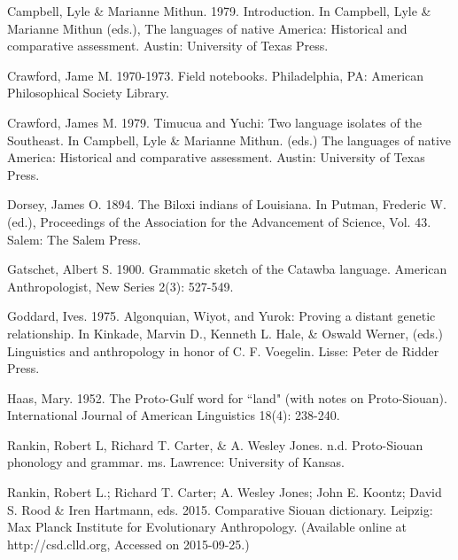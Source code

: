 \documentclass[output=paper]{LSP/langsci}
\begin{document}
{\begin{reflist}
Campbell, Lyle \& Marianne Mithun. 1979. Introduction. In Campbell, Lyle \& Marianne Mithun (eds.), The languages of native America: Historical and comparative assessment.  Austin: University of Texas Press.

 
 



Crawford, Jame M. 1970-1973. Field notebooks. Philadelphia, PA: American Philosophical Society Library.



Crawford, James M. 1979. Timucua and Yuchi: Two language isolates of the Southeast. In Campbell, Lyle \& Marianne Mithun. (eds.) The languages of native America: Historical and comparative assessment.  Austin: University of Texas Press.


 


Dorsey, James O. 1894. The Biloxi indians of Louisiana. In Putman, Frederic W. (ed.), Proceedings of the Association for the Advancement of Science, Vol. 43.  Salem: The Salem Press.

 

 


Gatschet, Albert S. 1900. Grammatic sketch of the Catawba language. American Anthropologist, New Series 2(3): 527-549.


 



Goddard, Ives. 1975. Algonquian, Wiyot, and Yurok: Proving a distant genetic relationship. In Kinkade, Marvin D., Kenneth L. Hale, \& Oswald Werner, (eds.) Linguistics and anthropology in honor of C. F. Voegelin. Lisse: Peter de Ridder Press.


 


Haas, Mary. 1952. The Proto-Gulf word for ``land" (with notes on Proto-Siouan). International Journal of American Linguistics 18(4): 238-240.


 

 

 
 


Rankin, Robert L, Richard T. Carter, \& A. Wesley Jones. n.d. Proto-Siouan phonology and grammar. ms. Lawrence: University of Kansas.



Rankin, Robert L.; Richard T. Carter; A. Wesley Jones; John E. Koontz; David S. Rood \& Iren Hartmann, eds. 2015. Comparative Siouan dictionary. Leipzig: Max Planck Institute for Evolutionary Anthropology. (Available online at http://csd.clld.org, Accessed on 2015-09-25.)


\end{reflist}}
\end{document}

